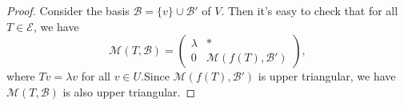 \documentclass{article}
\begin{document}
\begin{proof}
  Consider the basis \( \mathcal{B}=\{v\}\cup \mathcal{B}' \) of \( V \). Then it's easy to check that for all \( T\in \mathcal{E} \), we have
  \[ \mathcal{M}(T,\mathcal{B})=\begin{pmatrix}
    \lambda & * \\
    0 & \mathcal{M}(f(T),\mathcal{B}')
  \end{pmatrix}, \]
  where \( Tv=\lambda v \) for all \( v\in U \).Since \( \mathcal{M}(f(T),\mathcal{B}') \) is upper triangular, we have \( \mathcal{M}(T,\mathcal{B}) \) is also upper triangular.
\end{proof}
\end{document}
